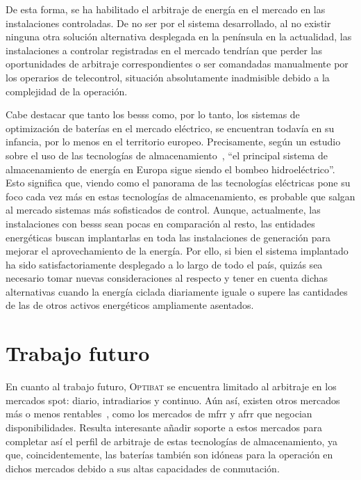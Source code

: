 De esta forma, se ha habilitado el arbitraje de energía en el mercado en las instalaciones controladas. De no ser por el sistema desarrollado, al no existir ninguna otra solución alternativa desplegada en la península en la actualidad, las instalaciones a controlar registradas en el mercado tendrían que perder las oportunidades de arbitraje correspondientes o ser comandadas manualmente por los operarios de telecontrol, situación absolutamente inadmisible debido a la complejidad de la operación.

Cabe destacar que tanto los \glspl{bess} como, por lo tanto, los sistemas de optimización de baterías en el mercado eléctrico, se encuentran todavía en su infancia, por lo menos en el territorio europeo. Precisamente, según un estudio sobre el uso de las tecnologías de almacenamiento~\cite{hu2022potential}, ``el principal sistema de almacenamiento de energía en Europa sigue siendo el bombeo hidroeléctrico''. Esto significa que, viendo como el panorama de las tecnologías eléctricas pone su foco cada vez más en estas tecnologías de almacenamiento, es probable que salgan al mercado sistemas más sofisticados de control. Aunque, actualmente, las instalaciones con \glspl{bess} sean pocas en comparación al resto, las entidades energéticas buscan implantarlas en toda las instalaciones de generación para mejorar el aprovechamiento de la energía. Por ello, si bien el sistema implantado ha sido satisfactoriamente desplegado a lo largo de todo el país, quizás sea necesario tomar nuevas consideraciones al respecto y tener en cuenta dichas alternativas cuando la energía ciclada diariamente iguale o supere las cantidades de las de otros activos energéticos ampliamente asentados.

\section{Trabajo futuro}
\label{makereference8.2}

En cuanto al trabajo futuro, \textsc{Optibat} se encuentra limitado al arbitraje en los mercados spot: diario, intradiarios y continuo. Aún así, existen otros mercados más o menos rentables~\cite{cnmc2024balance}, como los mercados de \gls{mfrr} y \gls{afrr} que negocian disponibilidades. Resulta interesante añadir soporte a estos mercados para completar así el perfil de arbitraje de estas tecnologías de almacenamiento, ya que, coincidentemente, las baterías también son idóneas para la operación en dichos mercados debido a sus altas capacidades de conmutación.

